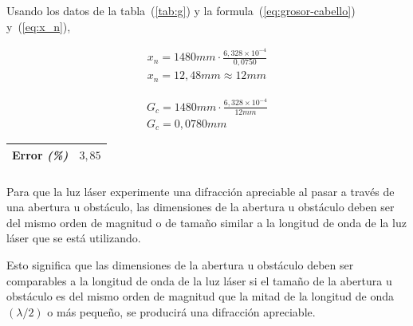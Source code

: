 \documentclass[twocolumn, 12pt]{article}
\newcommand{\bolditalic}[1]{\textbf{\textit{#1}}}
\begin{document}
Usando los datos de la tabla~(\ref{tab:g}) y la
formula~(\ref{eq:grosor-cabello}) y~(\ref{eq:x_n}),

\begin{equation*}
      \begin{gathered}
            x_{n} = 1480 mm \cdot \frac{6,328 \times 10^{-4}}{0,0750} \\
            x_{n} = 12,48 mm \approx 12 mm
      \end{gathered}
\end{equation*}

\noindent\makebox[\linewidth]{\rule{\linewidth}{0.4pt}}

\begin{equation*}
      \begin{gathered}
            G_{c} = 1480 mm \cdot \frac{6,328 \times 10^{-4}}{12mm} \\
            G_{c} = 0,0780 mm
      \end{gathered}
\end{equation*}

\begin{table}[H]
      \begin{center}
            \begin{tabularx}{\linewidth}{|>{\centering\arraybackslash}X|>{\centering\arraybackslash}X|}
                  \hline
                  Error \bolditalic{(\%)} & $3,85$ \\\hline
            \end{tabularx}
      \end{center}
\end{table}

\subsubsection{}

Para que la luz láser experimente una difracción apreciable
al pasar a través de una abertura u obstáculo, las
dimensiones de la abertura u obstáculo deben ser del mismo
orden de magnitud o de tamaño similar a la longitud de onda
de la luz láser que se está utilizando.

Esto significa que las dimensiones de la abertura u
obstáculo deben ser comparables a la longitud de onda de la
luz láser si el tamaño de la abertura u obstáculo es del
mismo orden de magnitud que la mitad de la longitud de onda
$(\lambda/2)$ o más pequeño, se producirá una difracción
apreciable.
\end{document}

